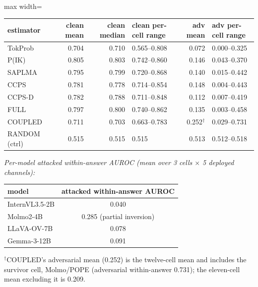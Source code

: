 \footnotesize
\setlength{\tabcolsep}{4pt}
\begin{adjustbox}{max width=\textwidth}
\begin{tabular}{@{}lrrlrl@{}}
\toprule
estimator & clean mean & clean median & clean per-cell range & adv mean & adv per-cell range \\
\midrule
TokProb & 0.704 & 0.710 & 0.565--0.808 & 0.072 & 0.000--0.325 \\
P(IK) & 0.805 & 0.803 & 0.742--0.860 & 0.146 & 0.043--0.370 \\
SAPLMA & 0.795 & 0.799 & 0.720--0.868 & 0.140 & 0.015--0.442 \\
CCPS & 0.781 & 0.778 & 0.714--0.854 & 0.148 & 0.004--0.443 \\
CCPS-D & 0.782 & 0.788 & 0.711--0.848 & 0.112 & 0.007--0.419 \\
\midrule
FULL & 0.797 & 0.800 & 0.740--0.862 & 0.135 & 0.003--0.458 \\
COUPLED & 0.711 & 0.703 & 0.663--0.783 & 0.252$^{\dagger}$ & 0.029--0.731 \\
RANDOM (ctrl) & 0.515 & 0.515 & 0.515 & 0.513 & 0.512--0.518 \\
\bottomrule
\end{tabular}
\end{adjustbox}

\vspace{4pt}
{\footnotesize\itshape Per-model attacked within-answer AUROC (mean over 3 cells $\times$ 5 deployed channels):}\\[2pt]
\footnotesize
\begin{tabular}{@{}lc@{}}
\toprule
model & attacked within-answer AUROC \\
\midrule
InternVL3.5-2B & 0.040 \\
Molmo2-4B & 0.285 (partial inversion) \\
LLaVA-OV-7B & 0.078 \\
Gemma-3-12B & 0.091 \\
\bottomrule
\end{tabular}

\vspace{2pt}
{\footnotesize $^{\dagger}$COUPLED's adversarial mean (0.252) is the twelve-cell mean and includes the survivor cell, Molmo/POPE (adversarial within-answer 0.731); the eleven-cell mean excluding it is 0.209.}
